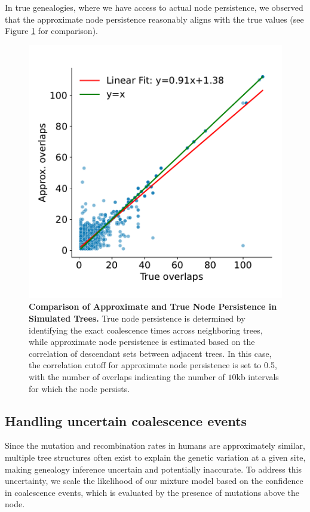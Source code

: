 In true genealogies, where we have access to actual node persistence, we observed that the approximate node persistence reasonably aligns with the true values (see Figure \ref{fig:gb_node_persistence} for comparison).

\begin{figure}
    \centering
    \includegraphics[width=0.5\linewidth]{figures/node_persistence_comparisons_0.5.pdf}
    \caption{\textbf{Comparison of Approximate and True Node Persistence in Simulated Trees.} True node persistence is determined by identifying the exact coalescence times across neighboring trees, while approximate node persistence is estimated based on the correlation of descendant sets between adjacent trees. In this case, the correlation cutoff for approximate node persistence is set to 0.5, with the number of overlaps indicating the number of $10$kb intervals for which the node persists.}
    \label{fig:gb_node_persistence}
\end{figure}

\subsection{Handling uncertain coalescence events}
\label{sec:ch2-gb-uncertain-coal}
Since the mutation and recombination rates in humans are approximately similar, multiple tree structures often exist to explain the genetic variation at a given site, making genealogy inference uncertain and potentially inaccurate. To address this uncertainty, we scale the likelihood of our mixture model based on the confidence in coalescence events, which is evaluated by the presence of mutations above the node.

